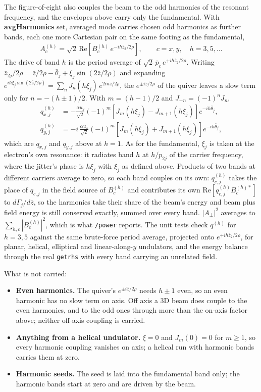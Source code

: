 \documentclass[12pt]{article}%
\begin{document}
The figure-of-eight also couples the beam to the odd harmonics of the resonant frequency, and the envelopes above carry only the fundamental. With {\bf avgHarmonics} set, averaged mode carries chosen odd harmonics as further bands, each one more Cartesian pair on the same footing as the fundamental,
\begin{align}
A_c^{(h)} = \sqrt{2}\,\mathrm{Re}\left[B_c^{(h)}\, e^{-i h\bar{z}_2/2\rho}\right], \qquad c = x, y, \quad h = 3, 5, \ldots
\end{align}
The drive of band $h$ is the period average of $\sqrt{2}\,\bar{p}_c\, e^{+i h \bar{z}_2/2\rho}$. Writing $\bar{z}_{2j}/2\rho = \bar{z}/2\rho - \bar{\theta}_j + \xi_j \sin(2\bar{z}/2\rho)$ and expanding $e^{i h \xi_j \sin(2\bar{z}/2\rho)} = \sum_n J_n(h\xi_j)\, e^{2 i n \bar{z}/2\rho}$, the $e^{\pm i\bar{z}/2\rho}$ of the quiver leaves a slow term only for $n = -(h \pm 1)/2$. With $m = (h-1)/2$ and $J_{-n} = (-1)^n J_n$,
\begin{align}
q^{(h)}_{x,j} &= -\frac{\alpha u_y}{\sqrt{2}} (-1)^m \left[J_m(h\xi_j) - J_{m+1}(h\xi_j)\right] e^{-i h\bar{\theta}_j}, \\
q^{(h)}_{y,j} &= -i\,\frac{\alpha u_x}{\sqrt{2}} (-1)^m \left[J_m(h\xi_j) + J_{m+1}(h\xi_j)\right] e^{-i h\bar{\theta}_j},
\end{align}
which are $q_{x,j}$ and $q_{y,j}$ above at $h = 1$. As for the fundamental, $\xi_j$ is taken at the electron's own resonance: it radiates band $h$ at $h/p_{2j}$ of the carrier frequency, where the jitter's phase is $h\xi_j$ with $\xi_j$ as defined above. Products of two bands at different carriers average to zero, so each band couples on its own: $q^{(h)}_{c,j}$ takes the place of $q_{c,j}$ in the field source of $B^{(h)}_c$ and contributes its own $\mathrm{Re}[q^{(h)}_{c,j} B^{(h)*}_c]$ to $d\Gamma_j/d\bar{z}$, so the harmonics take their share of the beam's energy and beam plus field energy is still conserved exactly, summed over every band. $|A_\bot|^2$ averages to $\sum_{h,c} |B^{(h)}_c|^2$, which is what {\tt /power} reports. The unit tests check $q^{(h)}$ for $h = 3, 5$ against the same brute-force period average, projected onto $e^{+i h \bar{z}_2/2\rho}$, for planar, helical, elliptical and linear-along-$y$ undulators, and the energy balance through the real {\tt getrhs} with every band carrying an unrelated field.

What is not carried:

\begin{itemize}
\item {\bf Even harmonics.} The quiver's $e^{\pm i\bar{z}/2\rho}$ needs $h \pm 1$ even, so an even harmonic has no slow term on axis. Off axis a 3D beam does couple to the even harmonics, and to the odd ones through more than the on-axis factor above; neither off-axis coupling is carried.
\item {\bf Anything from a helical undulator.} $\xi = 0$ and $J_m(0) = 0$ for $m \ge 1$, so every harmonic coupling vanishes on axis; a helical run with harmonic bands carries them at zero.
\item {\bf Harmonic seeds.} The seed is laid into the fundamental band only; the harmonic bands start at zero and are driven by the beam.
\end{itemize}
\end{document}
